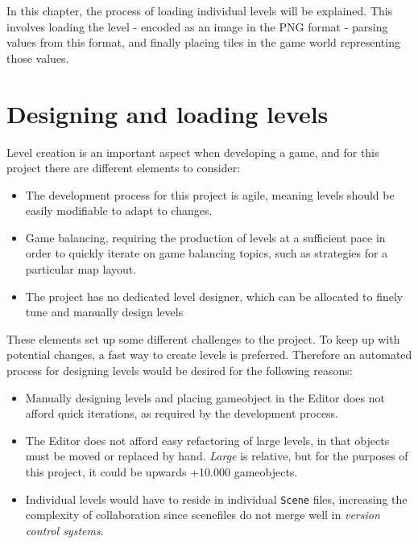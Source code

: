 In this chapter, the process of loading individual levels will be explained.
This involves loading the level - encoded as an image in the PNG format -
parsing values from this format, and finally placing tiles in the game world
representing those values.

\section{Designing and loading levels}
Level creation is an important aspect when developing a game, and for this
project there are different elements to consider:
\begin{itemize}
    \item The development process for this project is agile, meaning levels
        should be easily modifiable to adapt to changes.
    
    \item Game balancing, requiring the production of levels at a sufficient
        pace in order to quickly iterate on game balancing topics, such as
        strategies for a particular map layout.
        
    \item The project has no dedicated level designer, which can be allocated
        to finely tune and manually design levels
\end{itemize}

These elements set up some different challenges to the project.  To keep up
with potential changes, a fast way to create levels is preferred.  Therefore an
automated process for designing levels would be desired for the following
reasons:

\begin{itemize}
    \item Manually designing levels and placing gameobject in the Editor does
    not afford quick iterations, as required by the development process.  \item
        The Editor does not afford easy refactoring of large levels, in that
        objects must be moved or replaced by hand. \textit{Large} is relative,
        but for the purposes of this project, it could be upwards +10.000
        gameobjects.
    \item Individual levels would have to reside in individual \texttt{Scene}
        files, increasing the complexity of collaboration since scenefiles do
        not merge well in \textit{version control systems}.
\end{itemize}

